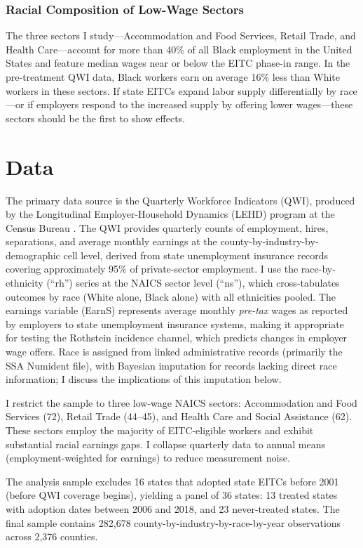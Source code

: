 \documentclass[12pt]{article}
\begin{document}
\subsubsection*{Racial Composition of Low-Wage Sectors} The three sectors I study---Accommodation and Food Services, Retail Trade, and Health Care---account for more than 40\% of all Black employment in the United States and feature median wages near or below the EITC phase-in range. In the pre-treatment QWI data, Black workers earn on average 16\% less than White workers in these sectors. If state EITCs expand labor supply differentially by race---or if employers respond to the increased supply by offering lower wages---these sectors should be the first to show effects.

\section{Data}

The primary data source is the Quarterly Workforce Indicators (QWI), produced by the Longitudinal Employer-Household Dynamics (LEHD) program at the Census Bureau \citep{abowd2009}. The QWI provides quarterly counts of employment, hires, separations, and average monthly earnings at the county-by-industry-by-demographic cell level, derived from state unemployment insurance records covering approximately 95\% of private-sector employment. I use the race-by-ethnicity (``rh'') series at the NAICS sector level (``ns''), which cross-tabulates outcomes by race (White alone, Black alone) with all ethnicities pooled. The earnings variable (EarnS) represents average monthly \textit{pre-tax} wages as reported by employers to state unemployment insurance systems, making it appropriate for testing the Rothstein incidence channel, which predicts changes in employer wage offers. Race is assigned from linked administrative records (primarily the SSA Numident file), with Bayesian imputation for records lacking direct race information; I discuss the implications of this imputation below.

I restrict the sample to three low-wage NAICS sectors: Accommodation and Food Services (72), Retail Trade (44--45), and Health Care and Social Assistance (62). These sectors employ the majority of EITC-eligible workers and exhibit substantial racial earnings gaps. I collapse quarterly data to annual means (employment-weighted for earnings) to reduce measurement noise.

The analysis sample excludes 16 states that adopted state EITCs before 2001 (before QWI coverage begins), yielding a panel of 36 states: 13 treated states with adoption dates between 2006 and 2018, and 23 never-treated states. The final sample contains 282,678 county-by-industry-by-race-by-year observations across 2,376 counties.
\end{document}
